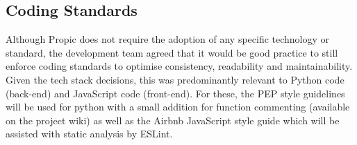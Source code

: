 \begin{spacing}{1.3}
\begin{table}[htbp!]
\centering
\small
\caption{Backend Technology Decision Matrix}
\label{my-label}
\begin{spacing}{1.1}
\end{spacing}{}
\end{table}

\subsection{Coding Standards}
Although Propic does not require the adoption of any specific technology or standard, the development team agreed that it would be good practice to still enforce coding standards to optimise consistency, readability and maintainability. Given the tech stack decisions, this was predominantly relevant to Python code (back-end) and JavaScript code (front-end). For these, the PEP style guidelines will be used for python with a small addition for function commenting (available on the project wiki) as well as the Airbnb JavaScript style guide which will be assisted with static analysis by ESLint.


\end{spacing}
